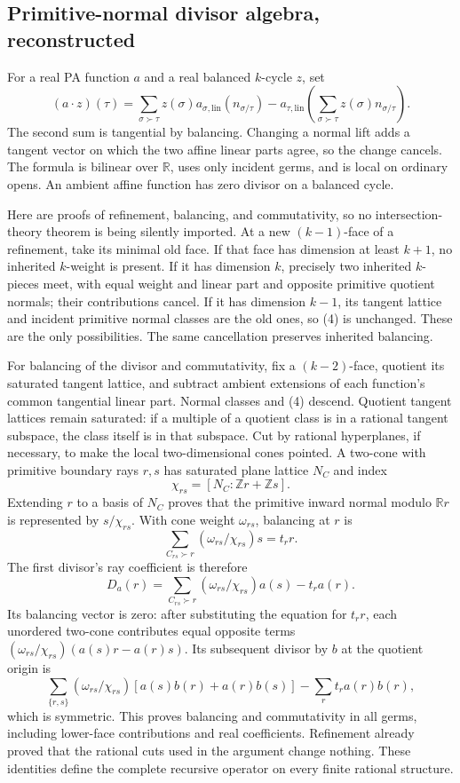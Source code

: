 \documentclass[
  10pt,
]{article}
\begin{document}
\subsection{Primitive-normal divisor algebra,
reconstructed}\label{primitive-normal-divisor-algebra-reconstructed}

For a real PA function \(a\) and a real balanced \(k\)-cycle \(z\), set
\[
 (a\cdot z)(\tau)=\sum_{\sigma\succ\tau}z(\sigma)a_{\sigma,\mathrm{lin}}(n_{\sigma/\tau})
 -a_{\tau,\mathrm{lin}}\left(\sum_{\sigma\succ\tau}z(\sigma)n_{\sigma/\tau}\right). \tag{4}
\] The second sum is tangential by balancing. Changing a normal lift
adds a tangent vector on which the two affine linear parts agree, so the
change cancels. The formula is bilinear over \(\mathbb{R}\), uses only
incident germs, and is local on ordinary opens. An ambient affine
function has zero divisor on a balanced cycle.

Here are proofs of refinement, balancing, and commutativity, so no
intersection-theory theorem is being silently imported. At a new
\((k-1)\)-face of a refinement, take its minimal old face. If that face
has dimension at least \(k+1\), no inherited \(k\)-weight is present. If
it has dimension \(k\), precisely two inherited \(k\)-pieces meet, with
equal weight and linear part and opposite primitive quotient normals;
their contributions cancel. If it has dimension \(k-1\), its tangent
lattice and incident primitive normal classes are the old ones, so (4)
is unchanged. These are the only possibilities. The same cancellation
preserves inherited balancing.

For balancing of the divisor and commutativity, fix a \((k-2)\)-face,
quotient its saturated tangent lattice, and subtract ambient extensions
of each function's common tangential linear part. Normal classes and (4)
descend. Quotient tangent lattices remain saturated: if a multiple of a
quotient class is in a rational tangent subspace, the class itself is in
that subspace. Cut by rational hyperplanes, if necessary, to make the
local two-dimensional cones pointed. A two-cone with primitive boundary
rays \(r,s\) has saturated plane lattice \(N_C\) and index \[
 \chi_{rs}=[N_C:\mathbb{Z}r+\mathbb{Z}s].
\] Extending \(r\) to a basis of \(N_C\) proves that the primitive
inward normal modulo \(\mathbb{R}r\) is represented by \(s/\chi_{rs}\).
With cone weight \(\omega_{rs}\), balancing at \(r\) is \[
 \sum_{C_{rs}\succ r}(\omega_{rs}/\chi_{rs})s=t_r r.
\] The first divisor's ray coefficient is therefore \[
 D_a(r)=\sum_{C_{rs}\succ r}(\omega_{rs}/\chi_{rs})a(s)-t_ra(r). \tag{5}
\] Its balancing vector is zero: after substituting the equation for
\(t_rr\), each unordered two-cone contributes equal opposite terms
\((\omega_{rs}/\chi_{rs})(a(s)r-a(r)s)\). Its subsequent divisor by
\(b\) at the quotient origin is \[
 \sum_{\{r,s\}}(\omega_{rs}/\chi_{rs})[a(s)b(r)+a(r)b(s)]
                      -\sum_r t_ra(r)b(r),                          \tag{6}
\] which is symmetric. This proves balancing and commutativity in all
germs, including lower-face contributions and real coefficients.
Refinement already proved that the rational cuts used in the argument
change nothing. These identities define the complete recursive operator
on every finite rational structure.
\end{document}
